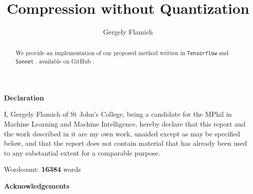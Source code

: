 \documentclass{article}
\title{Compression without Quantization}
\author{Gergely Flamich}
\begin{document}


%
%

\vspace{2cm}

\begin{center}
\Huge
\textbf{Declaration}
\end{center}

\vspace{1cm}

\large
\noindent I, Gergely Flamich of St John's College, being a candidate for the
MPhil in Machine Learning and Machine Intelligence, hereby declare that this
report and the work described in it are my own work, unaided except as may be
specified below, and that the report does not contain material that has
already been used to any substantial extent for a comparable purpose.


\vspace{2cm}

\large
\noindent
Wordcount: \textbf{16384} words

\newpage

%
%

\vspace{2cm}

\begin{center}
\Huge
\textbf{Acknowledgements}
\end{center}

\vspace{1cm}



\newpage

%
%

\begin{abstract}
  We provide an implementation of our proposed method written in \texttt{Tensorflow}
  \cite{tensorflow2015-whitepaper} and \texttt{Sonnet} \cite{sonnetblog},
  available on GitHub \footnotemark.
\end{abstract}

\end{document}
